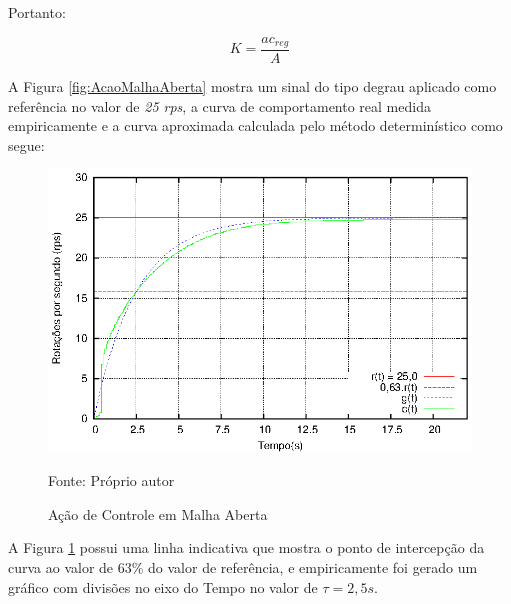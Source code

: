 Portanto:

\begin{equation}
K = \frac{ac_{reg}}{A}
\label{eq:calcK}
\end{equation}









A Figura \ref{fig:AcaoMalhaAberta} mostra um sinal do tipo degrau aplicado como referência no valor de \emph{25 rps}, a curva de comportamento real medida empiricamente e a curva aproximada calculada pelo método determinístico como segue:

\begin{figure}[!htb]
\caption{Ação de Controle em Malha Aberta}
\center\includegraphics[scale=1.4]{./imagens/acaoMalhaAbertaTau.eps}
\label{fig:acaoMalhaAberTau}

{\small Fonte: Próprio autor}
\end{figure}

A Figura \ref{fig:acaoMalhaAberTau} possui uma linha indicativa que mostra o ponto de intercepção da curva ao valor de 63\% do valor de referência, e empiricamente foi gerado um gráfico com divisões no eixo do Tempo no valor de $\tau = 2,5s $.

